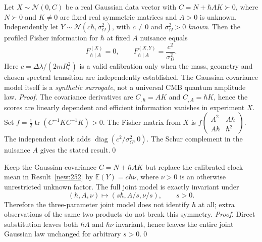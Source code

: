 \begin{result}\label{new:252}
Let $X\sim\mathcal N(0,C)$ be a real Gaussian data vector with $C=N+\hbar A K\succ0$, where $N\succ0$ and $K\ne0$ are fixed real symmetric matrices and $A>0$ is unknown. Independently let $Y\sim\mathcal N(c\hbar,\sigma_\Omega^2)$, with $c\ne0$ and $\sigma_\Omega^2>0$ \emph{known}. Then the profiled Fisher information for $\hbar$ at fixed $A$ nuisance equals
\begin{equation}\label{eq:twisted252}
 F_{\hbar\mid A}^{(X)}=0,\qquad F_{\hbar\mid A}^{(X,Y)}=\frac{c^2}{\sigma_\Omega^2}.
\end{equation}
Here $c=\Delta\lambda/(2mR_c^2)$ is a valid calibration only when the mass, geometry and chosen spectral transition are independently established. The Gaussian covariance model itself is a \emph{synthetic surrogate}, not a universal CMB quantum amplitude law.
\textit{Proof.} The covariance derivatives are $C_{,\hbar}=AK$ and $C_{,A}=\hbar K$, hence the scores are linearly dependent and efficient information vanishes in experiment $X$. Set $f=\tfrac12\operatorname{tr}(C^{-1}KC^{-1}K)>0$. The Fisher matrix from $X$ is $f\left(\begin{smallmatrix}A^2&A\hbar\\A\hbar&\hbar^2\end{smallmatrix}\right)$. The independent clock adds $\operatorname{diag}(c^2/\sigma_\Omega^2,0)$. The Schur complement in the nuisance $A$ gives the stated result.\qed
\end{result}

\begin{result}\label{new:253}
Keep the Gaussian covariance $C=N+\hbar A K$ but replace the calibrated clock mean in Result~\ref{new:252} by $\mathbb E(Y)=c\hbar\nu$, where $\nu>0$ is an otherwise unrestricted unknown factor. The full joint model is exactly invariant under
\begin{equation}\label{eq:twisted253}
 (\hbar,A,\nu)\longmapsto(s\hbar,A/s,\nu/s),\qquad s>0.
\end{equation}
Therefore the three-parameter joint model does not identify $\hbar$ at all; extra observations of the same two products do not break this symmetry.
\textit{Proof.} Direct substitution leaves both $\hbar A$ and $\hbar\nu$ invariant, hence leaves the entire joint Gaussian law unchanged for arbitrary $s>0$.\qed
\end{result}

